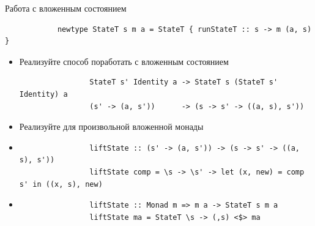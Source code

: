     \begin{frame}[fragile]{Работа с вложенным состоянием}
        \begin{verbatim}
            newtype StateT s m a = StateT { runStateT :: s -> m (a, s) }
        \end{verbatim}
        \begin{itemize}
            \item[\todo] Реализуйте способ поработать с вложенным состоянием
            \begin{verbatim}
                StateT s' Identity a -> StateT s (StateT s' Identity) a
                (s' -> (a, s'))      -> (s -> s' -> ((a, s), s'))
            \end{verbatim}
            \item[\todo] Реализуйте для произвольной вложенной монады
            \item[\answer] \pause
            \begin{verbatim}
                liftState :: (s' -> (a, s')) -> (s -> s' -> ((a, s), s'))
                liftState comp = \s -> \s' -> let (x, new) = comp s' in ((x, s), new)
            \end{verbatim}
            \item[\answer] \pause
            \begin{verbatim}
                liftState :: Monad m => m a -> StateT s m a
                liftState ma = StateT \s -> (,s) <$> ma
            \end{verbatim}
        \end{itemize}
    \end{frame}

